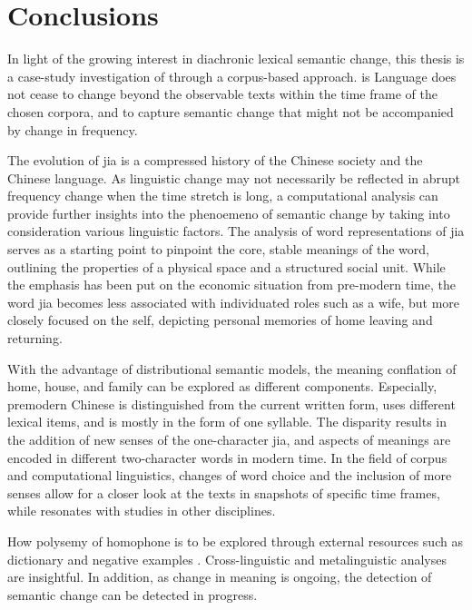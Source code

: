 

\chapter{Conclusions}
\label{conclusions}

In light of the growing interest in diachronic lexical semantic change, this thesis is a case-study investigation of \jia through a corpus-based approach. is Language does not cease to change beyond the observable texts within the time frame of the chosen corpora, and to capture semantic change that might not be accompanied by change in frequency.

The evolution of jia is a compressed history of the Chinese society and the Chinese language. As linguistic change may not necessarily be reflected in abrupt frequency change when the time stretch is long, a computational analysis can provide further insights into the phenoemeno of semantic change by taking into consideration various linguistic factors. The analysis of word representations of jia serves as a starting point to pinpoint the core, stable meanings of the word, outlining the properties of a physical space and a structured social unit. While the emphasis has been put on the economic situation from pre-modern time, the word jia becomes less associated with individuated roles such as a wife, but more closely focused on the self, depicting personal memories of home leaving and returning. 

With the advantage of distributional semantic models, the meaning conflation of home, house, and family can be explored as different components. Especially, premodern Chinese is distinguished from the current written form, uses different lexical items, and is mostly in the form of one syllable. The disparity results in the addition of new senses of the one-character jia, and aspects of meanings are encoded in different two-character words in modern time. In the field of corpus and computational linguistics, changes of word choice and the inclusion of more senses allow for a closer look at the texts in snapshots of specific time frames, while resonates with studies in other disciplines.

How polysemy of homophone is to be explored through external resources such as dictionary and negative examples \textcite[15]{traugott2001regularity}.  Cross-linguistic and metalinguistic analyses are insightful. In addition, as change in meaning is ongoing, the detection of semantic change can be detected in progress.

